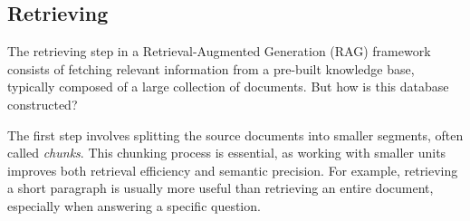     \subsection{Retrieving}
The retrieving step in a Retrieval-Augmented Generation (RAG) framework consists of fetching relevant information from a pre-built knowledge base, typically composed of a large collection of documents. But how is this database constructed?

The first step involves splitting the source documents into smaller segments, often called \textit{chunks}. This chunking process is essential, as working with smaller units improves both retrieval efficiency and semantic precision. For example, retrieving a short paragraph is usually more useful than retrieving an entire document, especially when answering a specific question.

